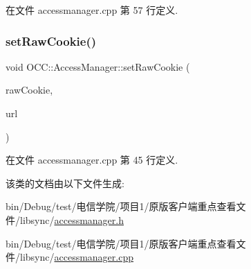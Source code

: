 在文件 accessmanager.\+cpp 第 57 行定义.

\mbox{\label{class_o_c_c_1_1_access_manager_a7b05693bd72035bf9d3825d20fc74130}} 
\subsubsection{\texorpdfstring{set\+Raw\+Cookie()}{setRawCookie()}}
{\footnotesize\ttfamily void O\+C\+C\+::\+Access\+Manager\+::set\+Raw\+Cookie (\begin{DoxyParamCaption}\item[{const Q\+Byte\+Array \&}]{raw\+Cookie,  }\item[{const Q\+Url \&}]{url }\end{DoxyParamCaption})}



在文件 accessmanager.\+cpp 第 45 行定义.



该类的文档由以下文件生成\+:\begin{DoxyCompactItemize}
\item 
bin/\+Debug/test/电信学院/项目1/原版客户端重点查看文件/libsync/\hyperlink{accessmanager_8h}{accessmanager.\+h}\item 
bin/\+Debug/test/电信学院/项目1/原版客户端重点查看文件/libsync/\hyperlink{accessmanager_8cpp}{accessmanager.\+cpp}\end{DoxyCompactItemize}
